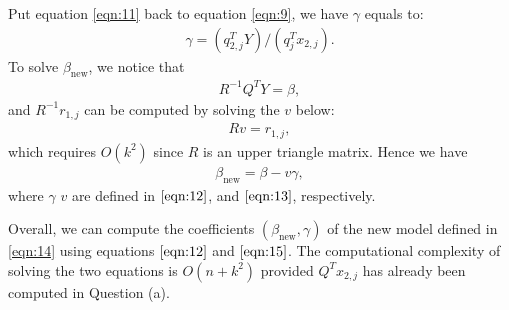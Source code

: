 \documentclass[12pt]{article}
\newcommand{\bet}{\beta}
\newcommand{\betln}[1]{\bet_{#1}}
\begin{document}
Put equation \eqref{eqn:11} back to equation \eqref{eqn:9},
we have $\gamma$ equals to:
\begin{align}
	\gamma = (q_{2,j}^T Y)/(q_j^Tx_{2,j}). \label{eqn:12}
\end{align}
To solve $\betln{\text{new}}$, we notice that
\begin{align*}
	 R^{-1}Q^TY = \beta, 
\end{align*}
and $R^{-1}r_{1,j}$ can be computed by solving
the $v$ below:
\begin{align}
	Rv = r_{1,j} \label{eqn:13}, 
\end{align}
which requires $O(k^2)$ since $R$ is an upper triangle
matrix. Hence we have
\begin{align}
	\betln{\text{new}} = \beta - v\gamma,  \label{eqn:15}
\end{align}
where $\gamma$ $v$ are defined in $\eqref{eqn:12}$,
and $\eqref{eqn:13}$, respectively.
 
Overall, we can compute the coefficients $(\betln{\text{new}},\gamma)$ of the new model
defined in \eqref{eqn:14} using equations $\eqref{eqn:12}$
and $\eqref{eqn:15}$. The computational complexity
of solving the two equations is 
$O(n + k^2)$ provided $Q^Tx_{2,j}$ has already 
been computed in Question (a).
\end{document}
